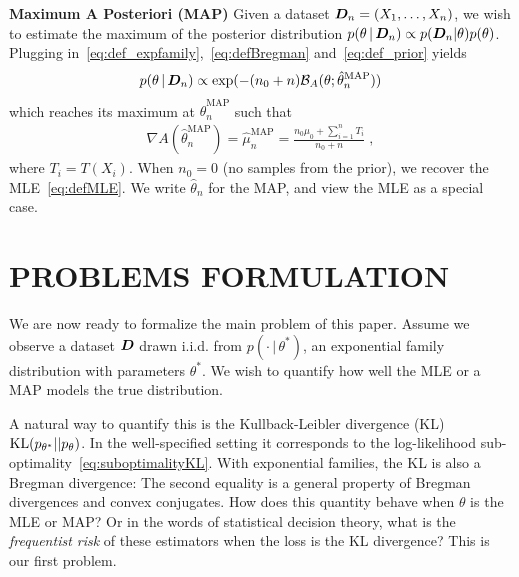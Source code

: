\documentclass[twoside]{article}
\let\oldsection\section
\renewcommand{\section}[1]{\oldsection{\texorpdfstring{\uppercase{#1}}{#1}}}
\newcommand{\cond}{\,\vert\,}
\newcommand{\logpart}{A}
\newcommand{\bregman}{\cB_\logpart}
\newcommand{\bregmanconj}{\cB_{\logpart^*}}
\newcommand{\nat}{\theta}
\newcommand{\m}{\mu}
\newcommand{\meanp}{\m}
\newcommand{\MAPm}{\hat \m_n}
\newcommand{\MAPt}{\hat \nat_n}
\begin{document}
{\bf Maximum A Posteriori (MAP)}
Given a dataset ${\bm{D}}_n =(X_1,\dots,X_n)$, we wish to estimate the maximum of the posterior distribution $p(\nat \cond \mD_n) \propto p(\mD_n|\nat)p(\nat)$.
Plugging in~\eqref{eq:def_expfamily},~\eqref{eq:defBregman} and~\eqref{eq:def_prior} yields
\begin{align}
	p(\nat \cond \mD_n)
    \propto \exp(- (n_0+n) \bregman(\nat; \MAPt^\text{MAP}))
    \label{eq:joint_likelihood}
\end{align}
which reaches its maximum at $\MAPt^\text{MAP}$ such that
\begin{align}
    \nabla \logpart(\MAPt^\text{MAP}) = \MAPm^\text{MAP}
    = \frac{n_0 \meanp_0 + \sum_{i=1}^n T_i}{n_0+n} \; ,
    \label{eq:defMAP}
\end{align}
where $T_i=T(X_i)$.
When $n_0=0$ (no samples from the prior), we recover the MLE~\eqref{eq:defMLE}.
We write $\MAPt$ for the MAP, and view the MLE as a special case.


\section{PROBLEMS FORMULATION}
\label{sec:problem}

We are now ready to formalize the main problem of this paper. Assume we observe a dataset ${\bm{D}}$ drawn i.i.d. from $p(\cdot \cond\nat^*)$, an exponential family distribution
with parameters $\nat^*$.
We wish to quantify how well the MLE or a MAP models the true distribution.

A natural way to quantify this is the Kullback-Leibler divergence (KL) $\KL(p_{\nat^*} || p_\nat)$. %
In the well-specified setting it corresponds to the log-likelihood sub-optimality~\eqref{eq:suboptimalityKL}.
With exponential families, the KL is also a Bregman divergence:
\alignn{
	\KL(p_{\nat^*} || p_\nat)
	 = \bregman(\nat ; \nat^*)
	 = \bregmanconj(\m^* ; \m) \; .
}
The second equality is a general property of Bregman divergences and convex conjugates. %
How does this quantity behave when $\nat$ is the MLE or MAP?
 Or in the words of statistical decision theory, what is the \emph{frequentist risk} of these estimators when the loss is the KL divergence? 
This is our first problem.
\end{document}
